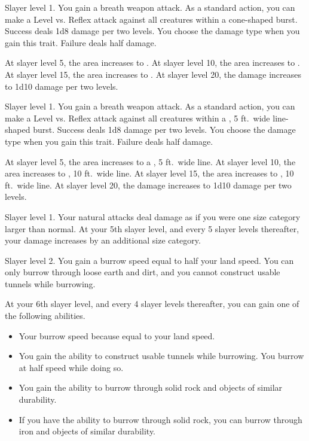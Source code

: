     \featpre Slayer level 1.
    \featben You gain a breath weapon attack.
    As a standard action, you can make a Level vs. Reflex attack against all creatures within a \areasmall cone-shaped burst.
    Success deals 1d8 damage per two levels.
    You choose the damage type when you gain this trait.
    Failure deals half damage.

    At slayer level 5, the area increases to \areamed.
    At slayer level 10, the area increases to \arealarge.
    At slayer level 15, the area increases to \areahuge.
    At slayer level 20, the damage increases to 1d10 damage per two levels.

    \featpre Slayer level 1.
    \featben You gain a breath weapon attack.
    As a standard action, you can make a Level vs. Reflex attack against all creatures within a \areamed, 5 ft.\ wide line-shaped burst.
    Success deals 1d8 damage per two levels.
    You choose the damage type when you gain this trait.
    Failure deals half damage.

    At slayer level 5, the area increases to a \arealarge, 5 ft.\ wide line.
    At slayer level 10, the area increases to \arealarge, 10 ft.\ wide line.
    At slayer level 15, the area increases to \areahuge, 10 ft.\ wide line.
    At slayer level 20, the damage increases to 1d10 damage per two levels.

    \featpre Slayer level 1.
    \featben Your natural attacks deal damage as if you were one size category larger than normal.
    At your 5th slayer level, and every 5 slayer levels thereafter, your damage increases by an additional size category.

    \featpre Slayer level 2.
    \featben You gain a burrow speed equal to half your land speed.
    You can only burrow through loose earth and dirt, and you cannot construct usable tunnels while burrowing.

    At your 6th slayer level, and every 4 slayer levels thereafter, you can gain one of the following abilities.
    \begin{itemize}
        \item Your burrow speed because equal to your land speed.
        \item You gain the ability to construct usable tunnels while burrowing.
            You burrow at half speed while doing so.
        \item You gain the ability to burrow through solid rock and objects of similar durability.
        \item If you have the ability to burrow through solid rock, you can burrow through iron and objects of similar durability.
    \end{itemize}

